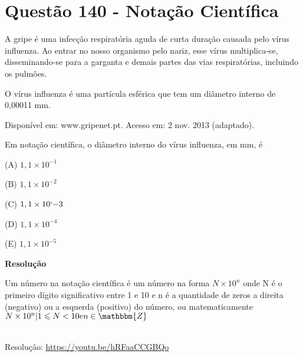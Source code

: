 \section{Questão 140 - Notação Científica}

A gripe é uma infecção respiratória aguda de curta duração causada pelo vírus influenza. Ao entrar no nosso organismo pelo nariz, esse vírus multiplica-se, disseminando-se para a garganta e demais partes das vias respiratórias, incluindo os pulmões. 

O vírus influenza é uma partícula esférica que tem um diâmetro interno de 0,00011 mm.

\begin{flushright}
    {\scriptsize Disponível em: www.gripenet.pt. Acesso em: 2 nov. 2013 (adaptado).}
\end{flushright}

Em notação científica, o diâmetro interno do vírus influenza, em mm, é

(A)  $ 1,1 \times 10^{-1} $

(B)  $ 1,1 \times 10^{-2} $

(C)  $ 1,1 \times 10`{-3} $

(D)  $ 1,1 \times 10^{-4} $

(E)  $ 1,1 \times 10^{-5} $

\textbf{Resolução}

Um número na notação científica é um número na forma $ N \times 10^{n} $ onde N é o primeiro dígito significativo entre 1 e 10 e n é a quantidade de zeros a direita (negativo) ou a esquerda (positivo) do número, ou matematicamente $ N \times 10^{n} | 1 \leqslant N < 10 e n \in \mathbbm{Z} $




\begin{center}
    \href{https://youtu.be/hRFaaCCGBQo}{
    }\\
    Resolução: \url{https://youtu.be/hRFaaCCGBQo}
\end{center}